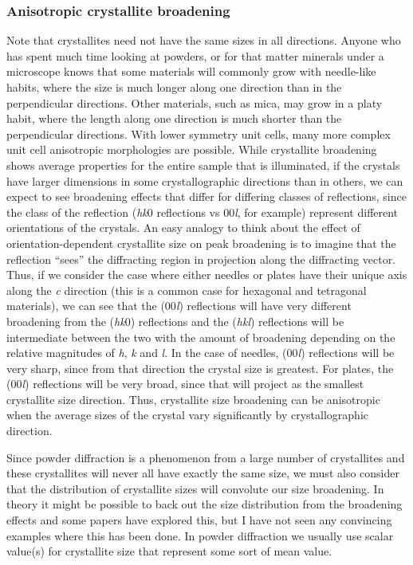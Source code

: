 \subsubsection{Anisotropic crystallite broadening}
 Note that crystallites need not have the same sizes in all directions. Anyone who has spent much time looking at powders, or for that matter minerals under a microscope knows that some materials will commonly grow with needle-like habits, where the size is much longer along one direction than in the perpendicular directions. Other materials, such as mica, may grow in a platy habit, where the length along one direction is much shorter than the perpendicular directions. With lower symmetry unit cells, many more complex unit cell anisotropic morphologies are possible. While crystallite broadening shows average properties for the entire sample that is illuminated, if the crystals have larger dimensions in some crystallographic directions than in others, we can expect to see broadening effects that differ for differing classes of reflections, since the class of the reflection (\textit{hk}0 reflections vs 00\textit{l}, for example) represent different orientations of the crystals. An easy analogy to think about the effect of orientation-dependent crystallite size on peak broadening is to imagine that the reflection “sees” the diffracting region in projection along the diffracting vector. Thus, if we consider the case where either needles or plates have their unique axis along the \textit{c} direction (this is a common case for hexagonal and tetragonal materials), we can see that the (00\textit{l}) reflections will have very different broadening from the (\textit{hk}0) reflections and the (\textit{hkl}) reflections will be intermediate between the two with the amount of broadening depending on the relative magnitudes of \textit{h}, \textit{k} and \textit{l}. In the case of needles, (00\textit{l}) reflections will be very sharp, since from that direction the crystal size is greatest. For plates, the (00\textit{l}) reflections will be very broad, since that will project as the smallest crystallite size direction. Thus, crystallite size broadening can be anisotropic when the average sizes of the crystal vary significantly by crystallographic direction. 

 Since powder diffraction is a phenomenon from a large number of crystallites and these crystallites will never all have exactly the same size, we must also consider that the distribution of crystallite sizes will convolute our size broadening. In theory it might be possible to back out the size distribution from the broadening effects and some papers have explored this, but I have not seen any convincing examples where this has been done. In powder diffraction we usually use scalar value(s) for crystallite size that represent some sort of mean value. 

